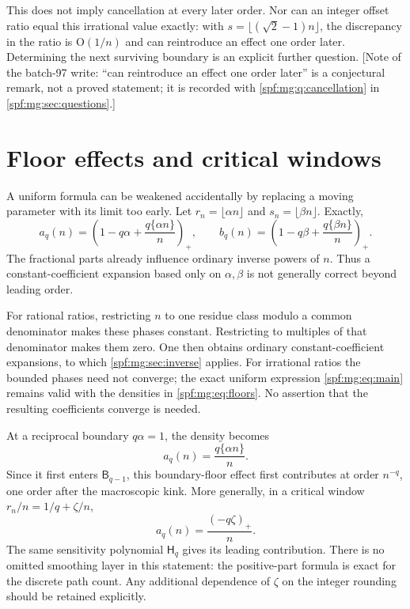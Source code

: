\documentclass[11pt]{article}
\numberwithin{equation}{section}
\theoremstyle{definition}
\theoremstyle{remark}
\theoremstyle{definition}
\newcommand{\bigO}{\mathrm O}
\begin{document}
This does not imply cancellation at every later order. Nor can an
integer offset ratio equal this irrational value exactly: with
$s=\lfloor(\sqrt2-1)n\rfloor$, the discrepancy in the ratio is
$\bigO(1/n)$ and can reintroduce an effect one order later. Determining
the next surviving boundary is an explicit further question.
[Note of the batch-97 write: ``can reintroduce an effect one order later''
is a conjectural remark, not a proved statement; it is recorded with
\cref{spf:mg:q:cancellation} in \cref{spf:mg:sec:questions}.]

\section{Floor effects and critical windows}
\label{spf:mg:sec:floors}

A uniform formula can be weakened accidentally by replacing a moving
parameter with its limit too early. Let
$r_n=\lfloor\alpha n\rfloor$ and
$s_n=\lfloor\beta n\rfloor$. Exactly,
\begin{equation}
 a_q(n)=\left(1-q\alpha+\frac{q\{\alpha n\}}{n}\right)_+,
 \qquad
 b_q(n)=\left(1-q\beta+\frac{q\{\beta n\}}{n}\right)_+.
 \label{spf:mg:eq:floors}
\end{equation}
The fractional parts already influence ordinary inverse powers of $n$.
Thus a constant-coefficient expansion based only on $\alpha,\beta$ is
not generally correct beyond leading order.

For rational ratios, restricting $n$ to one residue class modulo a
common denominator makes these phases constant. Restricting to multiples
of that denominator makes them zero. One then obtains ordinary
constant-coefficient expansions, to which \cref{spf:mg:sec:inverse} applies.
For irrational ratios the bounded phases need not converge; the exact
uniform expression \eqref{spf:mg:eq:main} remains valid with the densities in
\eqref{spf:mg:eq:floors}. No assertion that the resulting coefficients converge
is needed.

At a reciprocal boundary $q\alpha=1$, the density becomes
\begin{equation}
 a_q(n)=\frac{q\{\alpha n\}}n.
 \label{spf:mg:eq:boundary-floor}
\end{equation}
Since it first enters $\mathsf B_{q-1}$, this boundary-floor effect first
contributes at order $n^{-q}$, one order after the macroscopic kink.
More generally, in a critical window $r_n/n=1/q+\zeta/n$,
\begin{equation}
 a_q(n)=\frac{(-q\zeta)_+}{n}.
 \label{spf:mg:eq:critical-window}
\end{equation}
The same sensitivity polynomial $\mathsf H_q$ gives its leading contribution.
There is no omitted smoothing layer in this statement: the positive-part
formula is exact for the discrete path count. Any additional dependence
of $\zeta$ on the integer rounding should be retained explicitly.
\end{document}
